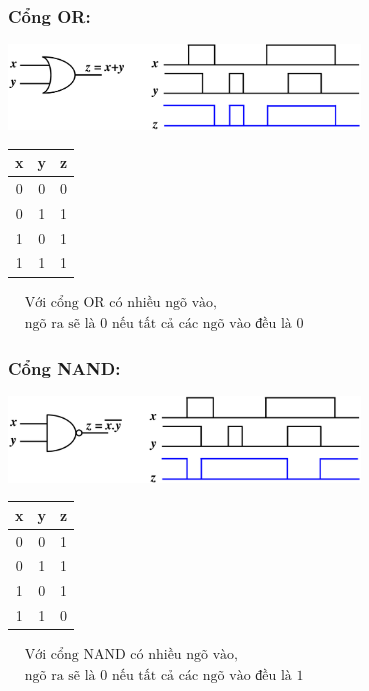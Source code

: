 \subsubsection{Cổng OR:}
\begin{center}
    \includegraphics[width = 0.7\textwidth]{./local/image/22.png}
\end{center}
\begin{table}[h!]
    \centering
    \begin{tabular}{|cc|c|}
    \hline
    \textbf{x} & \textbf{y} & \textbf{z} \\ \hline
    0          & 0          & 0                      \\ 
    0          & 1          & 1                      \\ 
    1          & 0          & 1                      \\ 
    1          & 1          & 1                      \\ \hline
    \end{tabular} \qquad 
    $\begin{aligned}
        &\text{Với cổng OR có nhiều ngõ vào,}\\
        &\text{ngõ ra sẽ là 0 nếu tất cả các ngõ vào đều là 0}
    \end{aligned}$
\end{table}
\subsubsection{Cổng NAND:}
\begin{center}
    \includegraphics[width = 0.7\textwidth]{./local/image/23.png}
\end{center}
\begin{table}[h!]
    \centering
    \begin{tabular}{|cc|c|}
    \hline
    \textbf{x} & \textbf{y} & \textbf{z} \\ \hline
    0          & 0          & 1                      \\ 
    0          & 1          & 1                      \\ 
    1          & 0          & 1                      \\ 
    1          & 1          & 0                      \\ \hline
    \end{tabular} \qquad 
    $\begin{aligned}
        &\text{Với cổng NAND có nhiều ngõ vào,}\\
        &\text{ngõ ra sẽ là 0 nếu tất cả các ngõ vào đều là 1}
    \end{aligned}$
\end{table}
